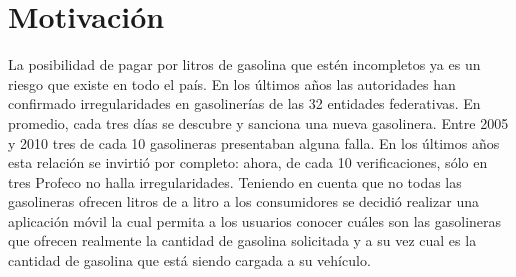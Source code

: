 \section{Motivación}
La posibilidad de pagar por litros de gasolina que estén incompletos ya es un riesgo que existe en todo el país. En los últimos años las autoridades han confirmado irregularidades en gasolinerías de las 32 entidades federativas. En promedio, cada tres días se descubre y sanciona una nueva gasolinera. \citep{Not1}
Entre 2005 y 2010 tres de cada 10 gasolineras presentaban alguna falla. En los últimos años esta relación se invirtió por completo: ahora, de cada 10 verificaciones, sólo en tres Profeco no halla irregularidades. \citep{Not2}
Teniendo en cuenta que no todas las gasolineras ofrecen litros de a litro a los consumidores se decidió realizar una aplicación móvil la cual permita a los usuarios conocer cuáles son las gasolineras que ofrecen realmente la cantidad de gasolina solicitada y a su vez cual es la cantidad de gasolina que está siendo cargada a su vehículo.